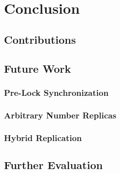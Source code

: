 \chapter{Conclusion}
\section{Contributions}
\section{Future Work}
\subsection{Pre-Lock Synchronization}
\subsection{Arbitrary Number Replicas}
\subsection{Hybrid Replication}
\section{Further Evaluation}
